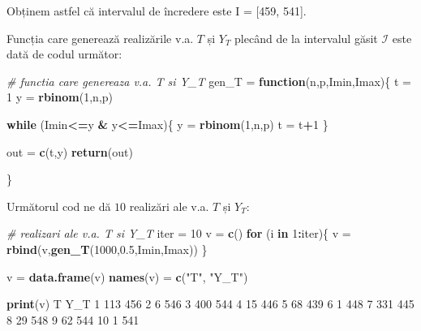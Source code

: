 \documentclass[]{article}
\newenvironment{Shaded}{\begin{snugshade}}{\end{snugshade}}
\newcommand{\KeywordTok}[1]{\textcolor[rgb]{0.13,0.29,0.53}{\textbf{#1}}}
\newcommand{\DecValTok}[1]{\textcolor[rgb]{0.00,0.00,0.81}{#1}}
\newcommand{\FloatTok}[1]{\textcolor[rgb]{0.00,0.00,0.81}{#1}}
\newcommand{\StringTok}[1]{\textcolor[rgb]{0.31,0.60,0.02}{#1}}
\newcommand{\CommentTok}[1]{\textcolor[rgb]{0.56,0.35,0.01}{\textit{#1}}}
\newcommand{\ControlFlowTok}[1]{\textcolor[rgb]{0.13,0.29,0.53}{\textbf{#1}}}
\newcommand{\OperatorTok}[1]{\textcolor[rgb]{0.81,0.36,0.00}{\textbf{#1}}}
\newcommand{\NormalTok}[1]{#1}
\begin{document}
Obținem astfel că intervalul de încredere este I = {[}459, 541{]}.

Funcția care generează realizările v.a. \(T\) și \(Y_T\) plecând de la
intervalul găsit \(\mathcal{I}\) este dată de codul următor:

\begin{Shaded}
\begin{Highlighting}[]
\CommentTok{# functia care genereaza v.a. T si Y_T}
\NormalTok{gen_T =}\StringTok{ }\ControlFlowTok{function}\NormalTok{(n,p,Imin,Imax)\{}
\NormalTok{  t =}\StringTok{ }\DecValTok{1}
\NormalTok{  y =}\StringTok{ }\KeywordTok{rbinom}\NormalTok{(}\DecValTok{1}\NormalTok{,n,p)}
  
  \ControlFlowTok{while}\NormalTok{ (Imin}\OperatorTok{<=}\NormalTok{y }\OperatorTok{&}\StringTok{ }\NormalTok{y}\OperatorTok{<=}\NormalTok{Imax)\{}
\NormalTok{    y =}\StringTok{ }\KeywordTok{rbinom}\NormalTok{(}\DecValTok{1}\NormalTok{,n,p)}
\NormalTok{    t =}\StringTok{ }\NormalTok{t}\OperatorTok{+}\DecValTok{1}
\NormalTok{  \}}
  
\NormalTok{  out =}\StringTok{ }\KeywordTok{c}\NormalTok{(t,y)}
  \KeywordTok{return}\NormalTok{(out)}
  
\NormalTok{\}}
\end{Highlighting}
\end{Shaded}

Următorul cod ne dă \(10\) realizări ale v.a. \(T\) și \(Y_T\):

\begin{Shaded}
\begin{Highlighting}[]
\CommentTok{# realizari ale v.a. T si Y_T}
\NormalTok{iter =}\StringTok{ }\DecValTok{10}
\NormalTok{v =}\StringTok{ }\KeywordTok{c}\NormalTok{()}
\ControlFlowTok{for}\NormalTok{ (i }\ControlFlowTok{in} \DecValTok{1}\OperatorTok{:}\NormalTok{iter)\{}
\NormalTok{  v =}\StringTok{ }\KeywordTok{rbind}\NormalTok{(v,}\KeywordTok{gen_T}\NormalTok{(}\DecValTok{1000}\NormalTok{,}\FloatTok{0.5}\NormalTok{,Imin,Imax))}
\NormalTok{\}}

\NormalTok{v =}\StringTok{ }\KeywordTok{data.frame}\NormalTok{(v)}
\KeywordTok{names}\NormalTok{(v) =}\StringTok{ }\KeywordTok{c}\NormalTok{(}\StringTok{"T"}\NormalTok{, }\StringTok{"Y_T"}\NormalTok{)}

\KeywordTok{print}\NormalTok{(v)}
\NormalTok{     T Y_T}
\DecValTok{1}  \DecValTok{113} \DecValTok{456}
\DecValTok{2}    \DecValTok{6} \DecValTok{546}
\DecValTok{3}  \DecValTok{400} \DecValTok{544}
\DecValTok{4}   \DecValTok{15} \DecValTok{446}
\DecValTok{5}   \DecValTok{68} \DecValTok{439}
\DecValTok{6}    \DecValTok{1} \DecValTok{448}
\DecValTok{7}  \DecValTok{331} \DecValTok{445}
\DecValTok{8}   \DecValTok{29} \DecValTok{548}
\DecValTok{9}   \DecValTok{62} \DecValTok{544}
\DecValTok{10}   \DecValTok{1} \DecValTok{541}
\end{Highlighting}
\end{Shaded}
\end{document}
